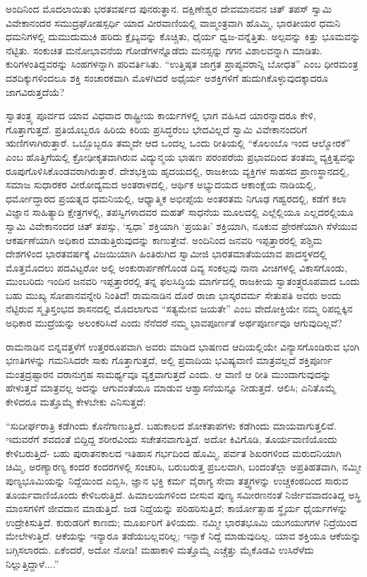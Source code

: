 ಅಂದಿನಿಂದ ಮೊದಲಾಯಿತು ಭರತವರ್ಷದ ಪುನರುತ್ಥಾನ. ದಕ್ಷಿಣೇಶ್ವರ ದೇವಮಾನವನ ಚಿತ್​ ತಪಸ್​ ಸ್ವಾಮಿ ವಿವೇಕಾನಂದರ ಸಮುದ್ರಘೋಷಸ್ಪರ್ಧಿ ಯಾದ ವೀರವಾಣಿಯಲ್ಲಿ ವಾಙ್ಮಂತ್ರವಾಗಿ ಹೊಮ್ಮಿ, ಭಾರತೀಯರ ಧಮನಿ ಧಮನಿಗಳಲ್ಲಿ ದುಮುದುಮುಕಿ ಹರಿದು ಕ್ಲೈಬ್ಯವನ್ನು ಕೊಚ್ಚಿತು, ಧೈರ್ಯ ಧ್ವಜ-ವನ್ನೆತ್ತಿತು. ಅಲ್ಪವನ್ನು ಕಿತ್ತು ಭೂಮವನ್ನು ನೆಟ್ಟಿತು. ಸಂಕುಚಿತ ಮನೋಭಾವನೆಯ ಗೋಡೆಗಳನ್ನೊಡೆದು ಮನಸ್ಸನ್ನು ಗಗನ ವಿಶಾಲವನ್ನಾಗಿ ಮಾಡಿತು. ಕುರಿಗಳಂತಿದ್ದವರನ್ನು ಸಿಂಹಗಳನ್ನಾಗಿ ಪರಿವರ್ತಿಸಿತು. “ಉತ್ತಿಷ್ಠತ ಜಾಗ್ರತ ಪ್ರಾಪ್ಯವರಾನ್ನಿ ಬೋಧತ” ಎಂಬ ಧೀರಮಂತ್ರ ದಶದಿಕ್ಕುಗಳಿಂದಲೂ ಶಕ್ತಿ ಸಂಚಾರಕವಾಗಿ ಮೊಳಗಿದರೆ ಅಧೈರ್ಯ ಅಶಕ್ತಿಗಳಿಗೆ ಹುದುಗಿಕೊಳ್ಳುವುದಕ್ಕಾದರೂ ಜಾಗವಿರುತ್ತದೆಯೆ?

ಸ್ವಾತಂತ್ರ್ಯ ಪೂರ್ವದ ಯಾವ ವಿಧವಾದ ರಾಷ್ಟ್ರೀಯ ಕಾರ್ಯಗಳಲ್ಲಿ ಭಾಗ ವಹಿಸಿದ ಯಾರನ್ನಾದರೂ ಕೇಳಿ, ಗೊತ್ತಾಗುತ್ತದೆ. ಪ್ರತಿಯೊಬ್ಬರೂ ಹಿರಿಯ ಕಿರಿಯ ಪ್ರಸಿದ್ಧರೆಂಬ ಭೇದವಿಲ್ಲದೆ ಸ್ವಾಮಿ ವಿವೇಕಾನಂದರಿಗೆ ಋಣಿಗಳಾಗಿರುತ್ತಾರೆ. ಒಬ್ಬೊಬ್ಬರೂ ತಮ್ಮದೇ ಆದ ಒಂದಲ್ಲ ಒಂದು ರೀತಿಯಲ್ಲಿ “ಕೊಲಂಬೊ ಇಂದ ಆಲ್ಮೋರಕೆ” ಎಂಬ ಹೊತ್ತಿಗೆಯಲ್ಲಿ ಕ್ರೋಢೀಕೃತವಾಗಿರುವ ವಿದ್ಯುನ್ಮಯ ಭಾಷಣ ಪರಂಪರೆಯ ಪ್ರಭಾವದಿಂದ ತಂತಮ್ಮ ವ್ಯಕ್ತಿತ್ವವನ್ನು ರೂಪುಗೊಳಿಸಿಕೊಂಡವರಾಗಿರುತ್ತಾರೆ. ದೇಶಭಕ್ತಿಯ ಹೃದಯದಲ್ಲಿ, ರಾಜಕೀಯ ವ್ಯಕ್ತಿಗಳ ಸಾಹಸದ ಪ್ರಾಣಸ್ಥಾನದಲ್ಲಿ, ಸಮಾಜ ಸುಧಾರಕರ ವೀರೋದ್ಯಮದ ಅಂತರಾಳದಲ್ಲಿ, ಆರ್ಥಿಕ ಅಭ್ಯುದಯದ ಆಕಾಂಕ್ಷೆಯ ನಾಡಿಯಲ್ಲಿ, ಧರ್ಮೋದ್ಧಾರದ ಪ್ರಯತ್ನದ ಧಮನಿಯಲ್ಲಿ, ಆಧ್ಯಾತ್ಮಿಕ ಅಭೀಪ್ಸೆಯ ಅಂತರತಮ ನಿಗೂಢ ಗಹ್ವರದಲ್ಲಿ, ಕಡೆಗೆ ಕಲಾ ವಿಜ್ಞಾನ ಸಾಹಿತ್ಯಾದಿ ಕ್ಷೇತ್ರಗಳಲ್ಲಿ, ತಪಸ್ವಿಗಳಾದವರ ಮಹತ್​ ಸಾಧನೆಯ ಮೂಲದಲ್ಲಿ ಎಲ್ಲೆಲ್ಲಿಯೂ ಎಲ್ಲದರಲ್ಲಿಯೂ ಸ್ವಾಮಿ ವಿವೇಕಾನಂದರ ಚಿತ್​ ತಪಸ್ಸು, ‘ಸ್ವಧಾ’ ಶಕ್ತಿಯಾಗಿ ‘ಪ್ರಯತಿಃ’ ಶಕ್ತಿಯಾಗಿ, ನೂಕುವ ಪ್ರೇರಣೆಯಾಗಿ ಸೆಳೆಯುವ ಆಕರ್ಷಣೆಯಾಗಿ ಅಧಿಕಾರ ಮಾಡುತ್ತಿರುವುದನ್ನು ಕಾಣುತ್ತೇವೆ. ಅಂದಿನಿಂದ ಜನವರಿ ಇಪ್ಪತ್ತಾರರಲ್ಲಿ ಪಶ್ಚಿಮ ದೇಶಗಳಿಂದ ಭಾರತವರ್ಷಕ್ಕೆ ವಿಜಯಿಯಾಗಿ ಹಿಂತಿರುಗಿದ ಸ್ವಾಮೀಜಿ ಭಾರತಮಾತೆಯ\break ಯಾವ ಪಾದಸ್ಥಳದಲ್ಲಿ ಮೊತ್ತಮೊದಲು ಪದವಿಟ್ಟರೋ ಅಲ್ಲಿ ಅಂಕುರಾರ್ಪಣೆಗೊಂಡ ದಿವ್ಯ ಸಂಕಲ್ಪವು ನಾನಾ ವೀಚಿಗಳಲ್ಲಿ ವಿಕಾಸಗೊಂಡು, ಮುಂಬರಿದು ಇಂದಿನ ಜನವರಿ ಇಪ್ಪತ್ತಾರರಲ್ಲಿ ತನ್ನ ಫಲಸಿದ್ಧಿಯ ಮಾರ್ಗದಲ್ಲಿ ರಾಜಕೀಯ ಸ್ವಾತಂತ್ರ್ಯರೂಪವಾದ ಒಂದು ಬಹು ಮುಖ್ಯ ಸೋಪಾನವನ್ನೇರಿ ನಿಂತಿದೆ! ರಾಮನಾಡಿನ ದೊರೆ ರಾಜಾ ಭಾಸ್ಕರವರ್ಮ ಸೇತುಪತಿ ಅವರು ಅಂದು ನೆಟ್ಟಿರುವ ಸ್ಮೃತಿಸ್ತಂಭದ ಶಾಸನದಲ್ಲಿ ಮೊದಲಾಗುವ “ಸತ್ಯಮೇವ ಜಯತೇ” ಎಂಬ ವೇದೋಕ್ತಿಯೇ ನಮ್ಮ ರಿಪಬ್ಲಿಕ್ಕಿನ ಅಧಿಕಾರ ಮುದ್ರೆಯನ್ನು ಅಲಂಕರಿಸಿದೆ ಎಂದು ನೆನೆದರೆ ನಮ್ಮ ಭಾವಪೂರ್ಣತೆ ಅರ್ಥಪೂರ್ಣವೂ ಆಗುವುದಿಲ್ಲವೆ?

ರಾಮನಾಡಿನ ಬಿನ್ನವತ್ತಳೆಗೆ ಉತ್ತರರೂಪವಾಗಿ ಅವರು ಮಾಡಿದ ಭಾಷಣದ ಆದಿಯಲ್ಲಿಯೇ ವಿನ್ಯಾಸಗೊಂಡಿರುವ ಭಂಗಿ ಭಣತಿಗಳನ್ನು ಗಮನಿಸಿದರೇ ಸಾಕು ಗೊತ್ತಾಗುತ್ತದೆ, ಅಲ್ಲಿ ಪ್ರವಾದಿಯ ಭವಿಷ್ಯವಾಣಿ ಮಾತ್ರವಲ್ಲದೆ ಶಕ್ತಿಪೂರ್ಣ ಮಂತ್ರದ್ರಷ್ಟಾರನ ವರಾನುಗ್ರಹ ಸಾಮರ್ಥ್ಯವೂ ವ್ಯಕ್ತವಾಗುತ್ತದೆ ಎಂದು. ಆ ವಾಣಿ ಆ ರೀತಿ ಮುಂದಾಗುವುದನ್ನು ಹೇಳುತ್ತದೆ ಮಾತ್ರವಲ್ಲ ಅದನ್ನು ಆಗುವಂತೆಯೂ ಮಾಡುವ ಆಶ್ವಾಸನೆಯನ್ನೂ ನೀಡುತ್ತದೆ. ಆಲಿಸಿ; ಎನಿತೊಮ್ಮೆ ಕೇಳಿದರೂ ಮತ್ತೊಮ್ಮೆ ಕೇಳಬೇಕು ಎನಿಸುತ್ತದೆ:

“ಸುದೀರ್ಘರಾತ್ರಿ ಕಡೆಗಿಂದು ಕೊನೆಗಾಣುತ್ತಿದೆ. ಬಹುಕಾಲದ ಶೋಕತಾಪಗಳು ಕಡೆಗಿಂದು ಮಾಯವಾಗುತ್ತಲಿವೆ. ಇದುವರೆಗೆ ಶವದಂತೆ ಬಿದ್ದಿದ್ದ ಶರೀರವಿಂದು ಸಚೇತನವಾಗುತ್ತಿದೆ. ಅದೋ ಕಿವಿಗೊಡಿ, ತೂರ್ಯವಾಣಿಯೊಂದು ಕೇಳಿಬರುತ್ತಿದೆ- ಬಹು ಪುರಾತನಕಾಲದ ಇತಿಹಾಸ ಗರ್ಭದಿಂದ ಹೊಮ್ಮಿ, ಪರ್ವತ ಶಿಖರಗಳಿಂದ ಮರುದನಿಯಾಗಿ ಚಿಮ್ಮಿ, ಅರಣ್ಯಾರಣ್ಯ ಕಂದರ ಕಂದರಗಳಲ್ಲಿ ಸಂಚರಿಸಿ, ಬರುಬರುತ್ತ ಪ್ರಬಲವಾಗಿ, ಬಂದಂತೆಲ್ಲಾ ಅಪ್ರತಿಹತವಾಗಿ, ನಮ್ಮೀ ಪುಣ್ಯಭೂಮಿಯನ್ನು ನಿದ್ದೆಯಿಂದ ಎಬ್ಬಿಸಿ, ಜ್ಞಾನ ಭಕ್ತಿ ಕರ್ಮ ವೈರಾಗ್ಯ ಸೇವಾ ತತ್ತ್ವಗಳನ್ನು ಉಚ್ಚಕಂಠದಿಂದ ಸಾರುವ ತೂರ್ಯವಾಣಿಯೊಂದು ಕೇಳಿಬರುತ್ತಿದೆ. ಹಿಮಾಲಯಗಳಿಂದ ಬೀಸುವ ಪುಣ್ಯ ಸಮೀರಣನಂತೆ ನಿರ್ಜೀವವಾದಂತಿದ್ದ ಅಸ್ಥಿ ಮಾಂಸಗಳಿಗೆ ಜೀವದಾನ ಮಾಡುತ್ತಿದೆ. ಜಡ ನಿದ್ದೆಯನ್ನು ಪರಿಹರಿಸುತ್ತಿದೆ; ಕಾರ್ಯೋತ್ಸಾಹ ಸ್ಥೈರ್ಯ ಧೈರ್ಯಗಳನ್ನು ಉದ್ರೇಕಿಸುತ್ತಿದೆ. ಕುರುಡರಿಗೆ ಕಾಣದು; ಮೂರ್ಖರಿಗೆ ತಿಳಿಯದು. ನಮ್ಮೀ ಭಾರತಭೂಮಿ ಯುಗಯುಗಗಳ ನಿದ್ರೆಯಿಂದ ಮೇಲೇಳುತ್ತಿದೆ. ಆಕೆಯನ್ನು ಇನ್ಯಾರೂ ತಡೆಯಬಲ್ಲವರಿಲ್ಲ; ಇನ್ನಾಕೆ ನಿದ್ದೆ ಮಾಡುವುದಿಲ್ಲ. ಯಾವ ಶಕ್ತಿಯೂ ಆಕೆಯನ್ನು ಬಗ್ಗಿಸಲಾರದು. ಏಕೆಂದರೆ, ಅದೋ ನೋಡಿ! ಮಹಾಕಾಳಿ ಮತ್ತೊಮ್ಮೆ ಎಚ್ಚೆತ್ತು ಮೈಕೊಡವಿ ಉಸಿರೆಳೆದು ನಿಲ್ಲುತ್ತಿದ್ದಾಳೆ....”

